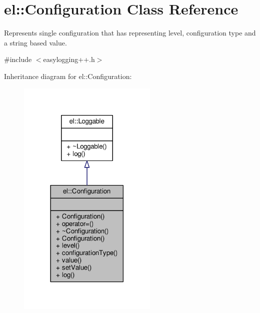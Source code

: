 \hypertarget{classel_1_1Configuration}{}\section{el\+:\+:Configuration Class Reference}
\label{classel_1_1Configuration}


Represents single configuration that has representing level, configuration type and a string based value.  




{\ttfamily \#include $<$easylogging++.\+h$>$}



Inheritance diagram for el\+:\+:Configuration\+:
\nopagebreak
\begin{figure}[H]
\begin{center}
\leavevmode
\includegraphics[width=189pt]{db/d5e/classel_1_1Configuration__inherit__graph}
\end{center}
\end{figure}



